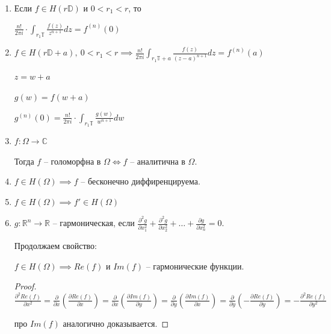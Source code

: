\begin{consequence}
    \begin{enumerate}
        \item {
            Если $f \in H(r \mathbb{D})$ и $0 < r_1 < r$, то

            $\frac{n!}{2 \pi i} \cdot \int_{r_1 \mathbb{T}} { \frac{f(z)}{z^{n+1}} dz } = f^{(n)} (0)$
        }
        \item {
            $f \in H(r \mathbb{D} + a), \ 0 < r_1 < r \implies \frac{n!}{2 \pi i} \int_{r_1 \mathbb{T} + a} { \frac{f(z)}{(z - a)^{n + 1}} dz } = f^{(n)} (a)$

            $z = w + a$

            $g(w) = f(w + a)$

            $g^{(n)} (0) = \frac{n!}{2 \pi i} \cdot \int_{r_1 \mathbb{T}} { \frac{g(w)}{w^{n + 1}} dw }$
        }
        \item {
            $f: \Omega \rightarrow \mathbb{C}$

            Тогда $f$ -- голоморфна в $\Omega \Leftrightarrow f$ -- аналитична в $\Omega$.

        }
        \item {
            $f \in H(\Omega) \implies f$ -- бесконечно диффиренцируема.
        }
        \item {
            $f \in H(\Omega) \implies f' \in H(\Omega)$
        }
        \item {
            \begin{definition}
                $g: \mathbb{R}^n \rightarrow \mathbb{R}$ -- гармоническая, если $\frac{\partial^2 g}{\partial x_1^2} + \frac{\partial^2 g}{\partial x_2^2} + \dots + \frac{\partial g}{\partial x_n^2} = 0$.
            \end{definition}

            Продолжаем свойство:

            $f \in H(\Omega) \implies Re (f)$ и $Im(f)$ -- гармонические функции.

            \begin{proof}
                $\frac{\partial^2 Re(f)}{\partial x^2} = \frac{\partial}{\partial x} \left( \frac{\partial Re (f)}{\partial x} \right) = \frac{\partial}{\partial x} \left( \frac{\partial Im(f)}{\partial y} \right) = \frac{\partial}{\partial y} \left( \frac{\partial Im(f)}{\partial x} \right) = \frac{\partial}{\partial y} \left( - \frac{\partial Re(f)}{\partial y} \right) = - \frac{\partial^2 Re(f)}{\partial y^2}$

                про $Im(f)$ аналогично доказывается.
            \end{proof}
        }
    \end{enumerate}
\end{consequence}

